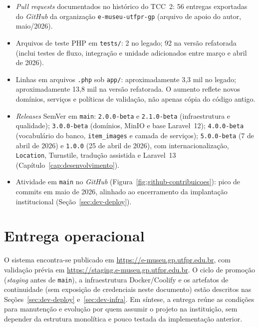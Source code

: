 \begin{itemize}
    \item \textit{Pull requests} documentados no histórico do TCC~2: 56 entregas exportadas do \textit{GitHub} da organização \texttt{e-museu-utfpr-gp} (arquivo de apoio do autor, maio/2026).
    \item Arquivos de teste PHP em \texttt{tests/}: 2 no legado; 92 na versão refatorada (inclui testes de fluxo, integração e unidade adicionados entre março e abril de 2026).
    \item Linhas em arquivos \texttt{.php} sob \texttt{app/}: aproximadamente 3,3 mil no legado; aproximadamente 13,8 mil na versão refatorada. O aumento reflete novos domínios, serviços e políticas de validação, não apenas cópia do código antigo.
    \item \textit{Releases} SemVer em \texttt{main}: \texttt{2.0.0-beta} e \texttt{2.1.0-beta} (infraestrutura e qualidade); \texttt{3.0.0-beta} (domínios, MinIO e base Laravel~12); \texttt{4.0.0-beta} (vocabulário do banco, \texttt{item\_images} e camada de serviços); \texttt{5.0.0-beta} (7 de abril de 2026) e \texttt{1.0.0} (25 de abril de 2026), com internacionalização, \texttt{Location}, Turnstile, tradução assistida e Laravel~13 (Capítulo~\ref{cap:desenvolvimento}).
    \item Atividade em \texttt{main} no \textit{GitHub} (Figura~\ref{fig:github-contribuicoes}): pico de commits em maio de 2026, alinhado ao encerramento da implantação institucional (Seção~\ref{sec:dev-deploy}).
\end{itemize}


\section{Entrega operacional}\label{sec:resultados-operacional}

O sistema encontra-se publicado em \url{https://e-museu.gp.utfpr.edu.br}, com validação prévia em \url{https://staging.e-museu.gp.utfpr.edu.br}. O ciclo de promoção (\textit{staging} antes de \texttt{main}), a infraestrutura Docker/Coolify e os artefatos de continuidade (sem exposição de credenciais neste documento) estão descritos nas Seções~\ref{sec:dev-deploy} e~\ref{sec:dev-infra}. Em síntese, a entrega reúne as condições para manutenção e evolução por quem assumir o projeto na instituição, sem depender da estrutura monolítica e pouco testada da implementação anterior.
